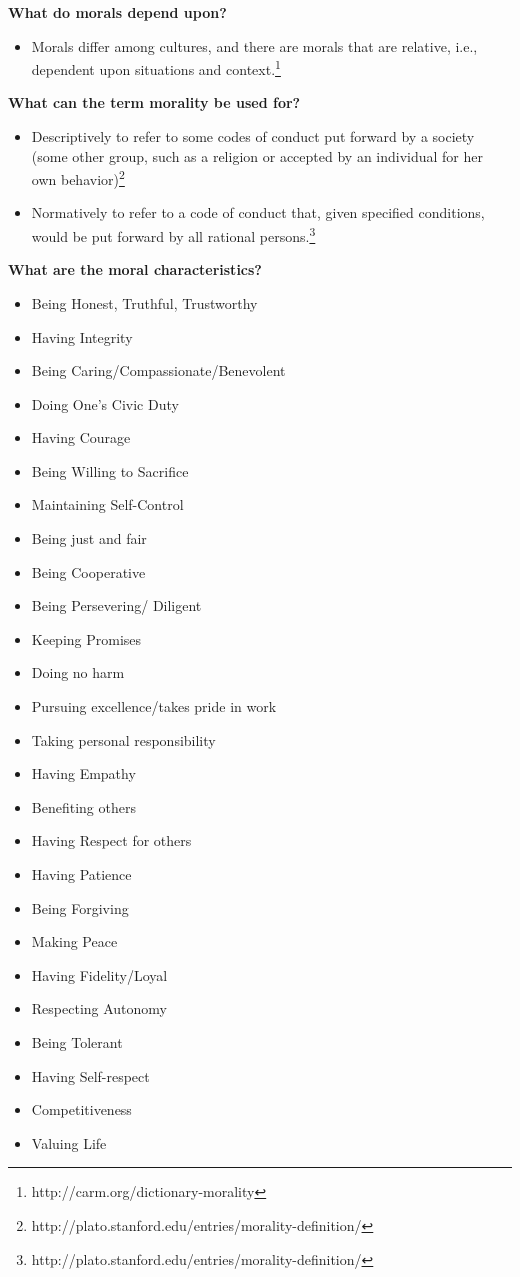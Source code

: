 \documentclass[11pt, oneside]{article}   	%
\begin{document}
\par \textbf{What do morals depend upon?}
\begin{itemize}
	\item Morals differ among cultures, and there are morals that are relative, i.e., dependent upon situations and context.\footnote{http://carm.org/dictionary-morality}
\end{itemize}

\par \textbf{What can the term morality be used for?}
\begin{itemize}
	\item Descriptively to refer to some codes of conduct put forward by a society (some other group, such as a religion or accepted by an individual for her own behavior)\footnote{http://plato.stanford.edu/entries/morality-definition/}
	\item Normatively to refer to a code of conduct that, given specified conditions, would be put forward by all rational persons.\footnote{http://plato.stanford.edu/entries/morality-definition/}
\end{itemize}

\par \textbf{What are the moral characteristics?}
\begin{itemize}
	\item Being Honest, Truthful, Trustworthy
	\item Having Integrity
	\item Being Caring/Compassionate/Benevolent
	\item Doing One's Civic Duty
	\item Having Courage
	\item Being Willing to Sacrifice
	\item Maintaining Self-Control
	\item Being just and fair
	\item Being Cooperative
	\item Being Persevering/ Diligent
	\item Keeping Promises
	\item Doing no harm
	\item Pursuing excellence/takes pride in work
	\item Taking personal responsibility
	\item Having Empathy
	\item Benefiting others 
	\item Having Respect for others
	\item Having Patience
	\item Being Forgiving
	\item Making Peace
	\item Having Fidelity/Loyal
	\item Respecting Autonomy
	\item Being Tolerant
	\item Having Self-respect
	\item Competitiveness
	\item Valuing Life
\end{itemize}
\end{document}
